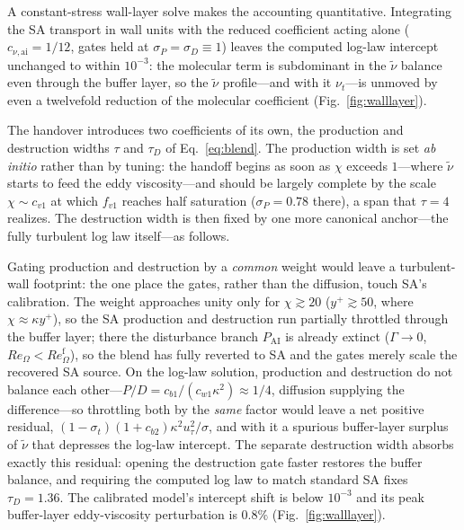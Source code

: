 \documentclass[journal]{new-aiaa}
\begin{document}
A constant-stress wall-layer solve makes the accounting quantitative. Integrating
the SA transport in wall units with the reduced coefficient acting alone
($c_{\nu,\mathrm{ai}}\!=\!1/12$, gates held at $\sigma_P\!=\!\sigma_D\!\equiv\!1$) leaves the
computed log-law intercept unchanged to within $10^{-3}$: the molecular term is
subdominant in the $\tilde\nu$ balance even through the buffer layer, so the
$\tilde\nu$ profile---and with it $\nu_t$---is unmoved by even a twelvefold
reduction of the molecular coefficient (Fig.~\ref{fig:walllayer}).

The handover introduces two coefficients of its own, the production and
destruction widths $\tau$ and $\tau_D$ of Eq.~\eqref{eq:blend}. The production
width is set \emph{ab initio} rather than
by tuning: the handoff begins as soon as $\chi$ exceeds $1$---where $\tilde\nu$
starts to feed the eddy viscosity---and should be largely complete by the scale
$\chi\!\sim\!c_{v1}$ at which $f_{v1}$ reaches half saturation
($\sigma_P\!=\!0.78$ there), a span that $\tau\!=\!4$ realizes. The destruction
width is then fixed by one more canonical anchor---the fully turbulent log law
itself---as follows.

Gating production and destruction by a \emph{common} weight would leave a
turbulent-wall footprint: the one place the gates, rather than the diffusion,
touch SA's calibration. The weight approaches unity only for
$\chi\!\gtrsim\!20$ ($y^+\!\gtrsim\!50$, where $\chi\!\approx\!\kappa y^+$), so the SA
production and destruction run partially throttled through the buffer layer; there
the disturbance branch $P_\mathrm{AI}$ is already extinct ($\Gamma\!\to\!0$,
$Re_\Omega\!<\!Re_\Omega^{\mathrm{f}}$), so the blend has fully reverted to SA and
the gates merely scale the recovered SA source. On the log-law solution,
production and destruction do not balance each other---$P/D =
c_{b1}/(c_{w1}\kappa^2)\!\approx\!1/4$, diffusion supplying the
difference---so throttling both by the \emph{same} factor would leave a net
positive
residual, $(1-\sigma_t)(1+c_{b2})\kappa^2 u_\tau^2/\sigma$, and with it a
spurious buffer-layer surplus of $\tilde\nu$ that depresses the log-law
intercept. The separate destruction width
absorbs exactly this residual: opening the destruction gate faster restores the
buffer balance, and requiring the computed log law
to match standard SA fixes
$\tau_D\!=\!1.36$. The calibrated model's intercept shift is below $10^{-3}$
and its peak buffer-layer
eddy-viscosity perturbation is $0.8\%$
(Fig.~\ref{fig:walllayer}).
\end{document}
